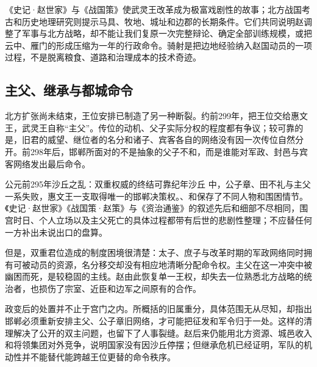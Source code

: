 \begin{debate}[胡服骑射的边界]
《史记·赵世家》与《战国策》使武灵王改革成为极富戏剧性的故事；北方战国考古和历史地理研究则提示马具、牧地、城址和边郡的长期条件。它们共同说明赵调整了军事与北方战略，却不能让我们复原一次完整辩论、确定全部训练规模，或把云中、雁门的形成压缩为一年的行政命令。骑射是把边地经验纳入赵国动员的一项过程，不是脱离粮食、道路和治理成本的技术奇迹。
\end{debate}

\subsection{主父、继承与都城命令}

北方扩张尚未结束，王位安排已制造了另一种断裂。约前299年，把王位交给惠文王，武灵王自称“主父”。传位的动机、父子实际分权的程度都有争议；较可靠的是，旧君的威望、继位者的名分和诸子、宾客各自的网络没有因一次传位自然分开。前298年后，邯郸所面对的不是抽象的父子不和，而是谁能对军政、封邑与宾客网络发出最后命令。

\begin{event}{公元前295年}{沙丘之乱：双重权威的终结}{可靠纪年}{沙丘}
中，公子章、田不礼与主父一系失败，惠文王一支取得唯一的邯郸决策权。、和保存了不同人物和围困情节。《史记·赵世家》《战国策·赵策》与《资治通鉴》的叙述先后和细部不尽相同，围宫时日、个人立场以及主父死亡的具体过程都带有后世的悲剧性整理；不应替任何一方补出未说出口的盘算。

但是，双重君位造成的制度困境很清楚：太子、庶子与改革时期的军政网络同时拥有可被动员的资源，名分移交却没有相应地清晰分配命令权。主父在这一冲突中被幽困而死，是较稳固的主线。赵由此恢复单一王权，却失去一位熟悉北方战略的统治者，也损伤了宗室、近臣和边军之间原有的合作。
\end{event}

政变后的处置并不止于宫门之内。所概括的旧属重分，具体范围无从尽知，却指出邯郸必须重新安排主父、公子章旧网络，才可能把征发和军令归于一处。这样的清理解决了公开的双主问题，也留下了人事裂缝。赵后来仍能用北方资源、城邑收入和将领集团对外竞争，说明国家没有因沙丘停摆；但继承危机已经证明，军队的机动性并不能替代能跨越王位更替的命令秩序。

